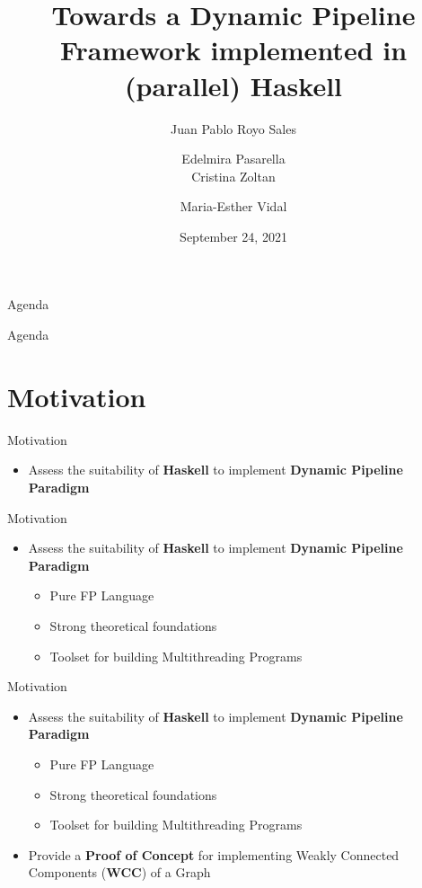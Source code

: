 \documentclass{beamer}
\title[DP in Haskell]{Towards a Dynamic Pipeline Framework implemented in (parallel) Haskell}
\author[Royo Sales et al. (PROLE2021)] 
{%
  Juan Pablo Royo Sales\inst{1} \and Edelmira Pasarella\inst{1}\\
  Cristina Zoltan\inst{1} \and Maria-Esther Vidal\inst{2}
}
\institute[] %
{
  \inst{1}%
  Universitat Politecnica de Catalunya\\
  juan.pablo.royo@upc.edu\\
  \{zoltan,edelmira\}@cs.upc.edu \and
  \inst{2}%
  TIB/L3S Research Centre at the University of Hannover\\
  maria.vidal@tib.eu
  }
\date[September 24, 2021] %
  {September 24, 2021}
\begin{document}
  \begin{frame}
    \vspace{1.2cm}
    \titlepage
  \end{frame}

  \begin{frame}{Agenda}
    \tableofcontents
  \end{frame}
  
  \begin{frame}{Agenda}
    \section{Motivation}
    \tableofcontents[currentsection]
  \end{frame}

  \begin{frame}[fragile]{Motivation}
    \begin{itemize}
      \item Assess the suitability of \textbf{Haskell} to implement \textbf{Dynamic Pipeline Paradigm}
    \end{itemize}    
  \end{frame}

  \begin{frame}[fragile]{Motivation}
    \begin{itemize}
      \item Assess the suitability of \textbf{Haskell} to implement \textbf{Dynamic Pipeline Paradigm}
      \vspace{0.5cm}
      \begin{itemize}
        \item Pure FP Language
        \item Strong theoretical foundations
        \item Toolset for building Multithreading Programs
      \end{itemize}
    \end{itemize}    
  \end{frame}

  \begin{frame}[fragile]{Motivation}
    \begin{itemize}
      \item Assess the suitability of \textbf{Haskell} to implement \textbf{Dynamic Pipeline Paradigm}
      \vspace{0.5cm}
      \begin{itemize}
        \item Pure FP Language
        \item Strong theoretical foundations
        \item Toolset for building Multithreading Programs
      \end{itemize}
      \vspace{0.5cm}
      \item Provide a \textbf{Proof of Concept} for implementing Weakly Connected Components (\textbf{WCC}) of a Graph
    \end{itemize}    
  \end{frame}
\end{document}
